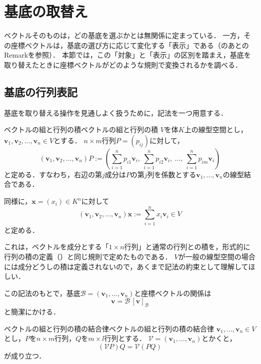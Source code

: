 \section{基底の取替え}

ベクトルそのものは，どの基底を選ぶかとは無関係に定まっている．
一方，その座標ベクトルは，基底の選び方に応じて変化する「表示」である（のあとのRemarkを参照）．
本節では，この「対象」と「表示」の区別を踏まえ，基底を取り替えたときに座標ベクトルがどのような規則で変換されるかを調べる．

\subsection{基底の行列表記}

基底を取り替える操作を見通しよく扱うために，記法を一つ用意する．

\begin{definition}{ベクトルの組と行列の積}{ベクトルの組と行列の積}
  $V$を体$K$上の線型空間とし，$\bm{v}_1, \bm{v}_2, \dots, \bm{v}_n \in V$とする．
  $n \times m$行列$P = (p_{ij})$に対して，
  \[
    (\bm{v}_1, \bm{v}_2, \dots, \bm{v}_n) P
    :=
    \left( \sum_{i=1}^{n} p_{i1} \bm{v}_i,~ \sum_{i=1}^{n} p_{i2} \bm{v}_i,~ \dots,~ \sum_{i=1}^{n} p_{im} \bm{v}_i \right)
  \]
  と定める．すなわち，右辺の第$j$成分は$P$の第$j$列を係数とする$\bm{v}_1, \dots, \bm{v}_n$の線型結合である．

  同様に，$\bm{x} = (x_i) \in K^n$に対して
  \[
    (\bm{v}_1, \bm{v}_2, \dots, \bm{v}_n) \bm{x}
    := \sum_{i=1}^{n} x_i \bm{v}_i \in V
  \]
  と定める．
\end{definition}

\begin{remark}[形式的な行列記法について]
  これは，ベクトルを成分とする「$1 \times n$行列」と通常の行列との積を，形式的に行列の積の定義（）と同じ規則で定めたものである．
  $V$が一般の線型空間の場合には成分どうしの積は定義されないので，あくまで記法の約束として理解してほしい．

  この記法のもとで，基底$\mathcal{B} = (\bm{v}_1, \dots, \bm{v}_n)$と座標ベクトルの関係は
  \[
    \bm{v} = \mathcal{B} \, [\bm{v}]_{\mathcal{B}}
  \]
  と簡潔にかける．
\end{remark}

\begin{prop}{ベクトルの組と行列の積の結合律}{ベクトルの組と行列の積の結合律}
  $\bm{v}_1, \dots, \bm{v}_n \in V$とし，$P$を$n \times m$行列，$Q$を$m \times l$行列とする．
  $\mathcal{V} = (\bm{v}_1, \dots, \bm{v}_n)$とかくと，
  \[
    (\mathcal{V} P) Q = \mathcal{V} (PQ)
  \]
  が成り立つ．
\end{prop}

